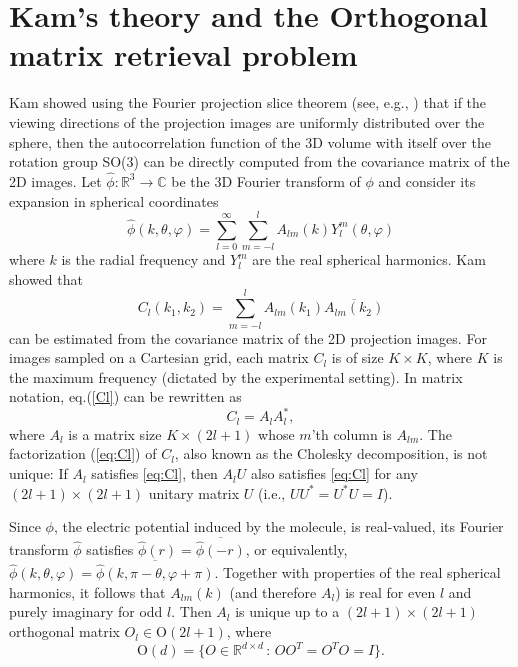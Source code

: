 \documentclass{article}
\begin{document}
\section{Kam's theory and the Orthogonal matrix retrieval problem}
Kam showed \cite{kam1980} using the Fourier projection slice theorem (see, e.g., \cite[p. 11]{Natr2001a}) that if the viewing
directions of the projection images are uniformly distributed over the sphere, then the
autocorrelation function of the 3D volume with itself over the rotation group
SO(3) can be directly computed from the
covariance matrix of the 2D images. Let $\hat \phi : \mathbb{R}^3 \to \mathbb{C}$ be the 3D Fourier
transform of $\phi$ and consider its expansion in spherical coordinates 
\begin{equation}
\hat{\phi}(k,\theta,\varphi) = \sum_{l=0}^{\infty} \sum_{m=-l}^{l} A_{lm}(k) Y_l^m
(\theta, \varphi)
\end{equation}
where $k$ is the radial frequency and $Y_l^m$ are the real spherical
harmonics. Kam showed that   
\begin{equation}
\label{Cl}
C_l(k_1,k_2) = \sum_{m=-l}^l A_{lm}(k_1)\overline{A_{lm}(k_2)}  
\end{equation}
can be estimated from the covariance matrix of the 2D projection images. For images sampled on a Cartesian grid, each matrix $C_l$ is of size $K\times K$, where $K$ is the maximum frequency (dictated by the experimental setting). In matrix notation, eq.(\ref{Cl}) can be rewritten as
\begin{equation}
C_l=A_l A_l^*, \label{eq:Cl}
\end{equation}
where $A_l$ is a matrix size
$K \times (2l+1)$ whose $m$'th column is $A_{lm}$. 
The factorization (\ref{eq:Cl}) of $C_l$, also known as the Cholesky decomposition, is not unique: If
$A_l$ satisfies \eqref{eq:Cl}, then $A_lU$ also satisfies \eqref{eq:Cl} for any $(2l+1) \times (2l+1)$ unitary matrix
$U$ (i.e., $UU^* = U^*U = I$). 

Since $\phi$, the electric potential induced by the molecule, is
real-valued, its Fourier transform $\hat{\phi}$ satisfies
$\hat{\phi}(r)=\overline{\hat{\phi}(-r)}$, or equivalently,
$\hat{\phi}(k,\theta,\varphi)=\overline{\hat{\phi}(k,\pi-\theta,\varphi+\pi)}$.
Together with properties of the real spherical harmonics, it follows that
$A_{lm}(k)$ (and therefore $A_l$) is real for even
$l$ and purely imaginary for odd $l$. Then $A_l$ is unique up to a
$(2l+1)\times (2l+1)$ orthogonal matrix $O_l\in \text{O}(2l+1)$, where 
\begin{equation}
\text{O}(d)=\{O\in \mathbb{R}^{d\times d} \,:\, OO^T=O^TO=I \}.
\end{equation}
\end{document}
